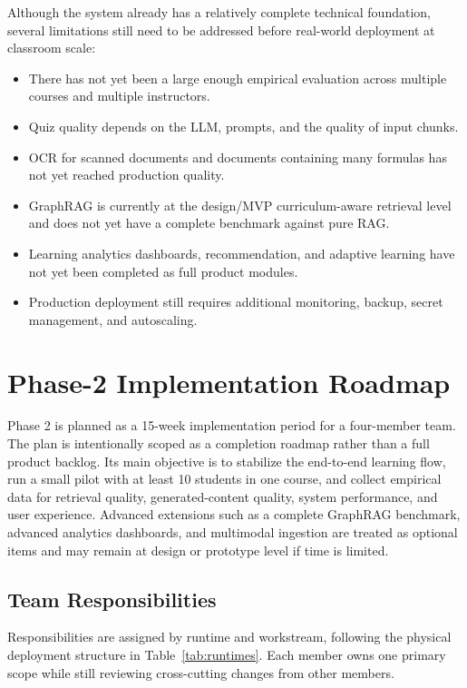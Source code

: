 Although the system already has a relatively complete technical
foundation, several limitations still need to be addressed before
real-world deployment at classroom scale:
\begin{itemize}
    \item There has not yet been a large enough empirical evaluation
          across multiple courses and multiple instructors.
    \item Quiz quality depends on the LLM, prompts, and the quality of
          input chunks.
    \item OCR for scanned documents and documents containing many
          formulas has not yet reached production quality.
    \item GraphRAG is currently at the design/MVP curriculum-aware
          retrieval level and does not yet have a complete benchmark
          against pure RAG.
    \item Learning analytics dashboards, recommendation, and adaptive
          learning have not yet been completed as full product modules.
    \item Production deployment still requires additional monitoring,
          backup, secret management, and autoscaling.
\end{itemize}

\section{Phase-2 Implementation Roadmap}
\label{sec:plan-gd2}

Phase 2 is planned as a 15-week implementation period for a four-member
team. The plan is intentionally scoped as a completion roadmap rather
than a full product backlog. Its main objective is to stabilize the
end-to-end learning flow, run a small pilot with at least 10 students in
one course, and collect empirical data for retrieval quality,
generated-content quality, system performance, and user experience.
Advanced extensions such as a complete GraphRAG benchmark, advanced
analytics dashboards, and multimodal ingestion are treated as optional
items and may remain at design or prototype level if time is limited.

\subsection{Team Responsibilities}
\label{subsec:roles-gd2}

Responsibilities are assigned by runtime and workstream, following the
physical deployment structure in Table~\ref{tab:runtimes}. Each member
owns one primary scope while still reviewing cross-cutting changes from
other members.

